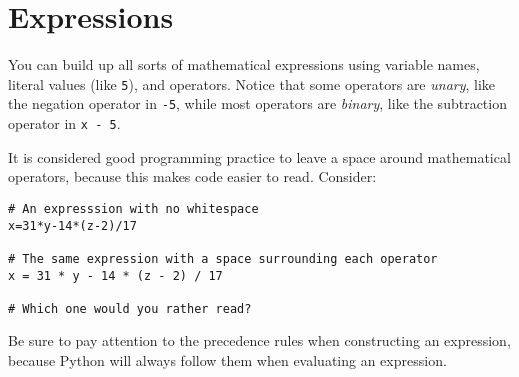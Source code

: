 \section{Expressions}

You can build up all sorts of mathematical expressions using variable names, literal values (like \texttt{5}), and operators.  Notice that some operators are \textit{unary}, like the negation operator in \texttt{-5}, while most operators are \textit{binary}, like the subtraction operator in \texttt{x - 5}.

It is considered good programming practice to leave a space around mathematical operators, because this makes code easier to read.  Consider:

\begin{verbatim}
# An expresssion with no whitespace
x=31*y-14*(z-2)/17

# The same expression with a space surrounding each operator
x = 31 * y - 14 * (z - 2) / 17

# Which one would you rather read?
\end{verbatim}

Be sure to pay attention to the precedence rules when constructing an expression, because Python will always follow them when evaluating an expression.